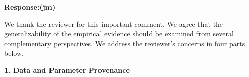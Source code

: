 \documentclass[11pt]{article}
\newcommand{\expected}{\noindent\textbf{Expected outputs.} }
\begin{document}
\begin{enumerate}[label=(R1.Major.\arabic*),leftmargin=*]




\noindent\textbf{Response:(jm)}

We thank the reviewer for this important comment. We agree that the generalizability of the empirical evidence should be examined from several complementary perspectives. We address the reviewer's concerns in four
parts below.

\vspace{2mm}
\noindent\textbf{1. Data and Parameter Provenance}



\end{enumerate}
\end{document}
